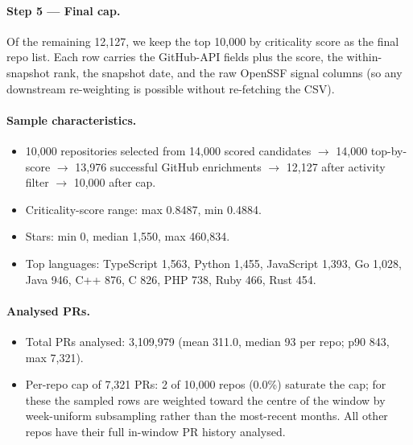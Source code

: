 \paragraph{Step 5 --- Final cap.} Of the remaining 12,127{}, we keep the top
10,000{} by criticality score as the final repo list.
Each row carries the GitHub-API fields plus the score, the within-snapshot
rank, the snapshot date, and the raw OpenSSF signal columns (so any
downstream re-weighting is possible without re-fetching the CSV).

\paragraph{Sample characteristics.}
\begin{itemize}
\item 10,000{} repositories selected from
14,000{} scored candidates $\to$ 14,000{}
top-by-score $\to$ 13,976{} successful GitHub enrichments
$\to$ 12,127{} after activity filter $\to$
10,000{} after cap.
\item Criticality-score range: max 0.8487{}, min 0.4884{}.
\item Stars: min 0{}, median 1,550{}, max 460,834{}.
\item Top languages: TypeScript 1{,}563, Python 1{,}455, JavaScript 1{,}393, Go 1{,}028, Java 946, C++ 876, C 826, PHP 738, Ruby 466, Rust 454{}.
\end{itemize}

\paragraph{Analysed PRs.}
\begin{itemize}
\item Total PRs analysed: 3,109,979 (mean 311.0, median 93 per repo; p90 843, max 7,321).
\item Per-repo cap of 7,321{} PRs: 2 of 10,000{} repos (0.0\%) saturate the cap; for these the sampled rows are weighted toward the centre of the window by week-uniform subsampling rather than the most-recent months. All other repos have their full in-window PR history analysed.
\end{itemize}

